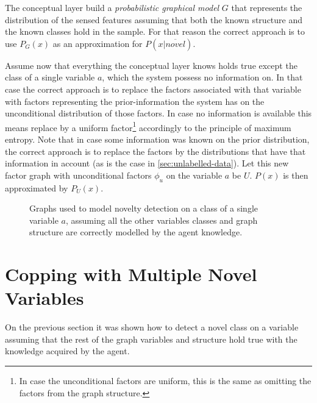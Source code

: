 The conceptual layer build a \emph{probabilistic graphical model} $G$ that
represents the distribution of the sensed features assuming that both the known
structure and the known classes hold in the sample.
For that reason the correct approach is to use $P_G(x)$ as an approximation for
$P(x|\overline{novel})$.

Assume now that everything the conceptual layer knows holds true except the
class of a single variable $a$, which the system possess no information on. 
In that case the correct approach is to replace the factors associated with
that variable with factors representing the prior-information the system has on
the unconditional distribution of those factors.
In case no information is available this means replace by a uniform factor\footnote{In case the
unconditional factors are uniform, this is the same as omitting the factors
from the graph structure.} accordingly to the principle of maximum entropy.
Note that in case some information was known on the prior distribution, the
correct approach is to replace the factors by the distributions that have that
information in account (as is the case in \autoref{sec:unlabelled-data}).
Let this new factor graph with unconditional factors $\phi_u$ on the variable
$a$ be $U$. $P(x)$ is then approximated by $P_U(x)$.

\begin{figure}[h]
\centering
{}
\qquad\qquad
{}

\caption{\label{fig:nd-single-variable}Graphs used to model novelty detection on
         a class of a single variable $a$, assuming all the other variables
         classes and graph structure are correctly modelled by the agent
         knowledge.}
\end{figure}


\section{Copping with Multiple Novel Variables}
On the previous section it was shown how to detect a novel class on a variable
assuming that the rest of the graph variables and structure hold true with the
knowledge acquired by the agent.


